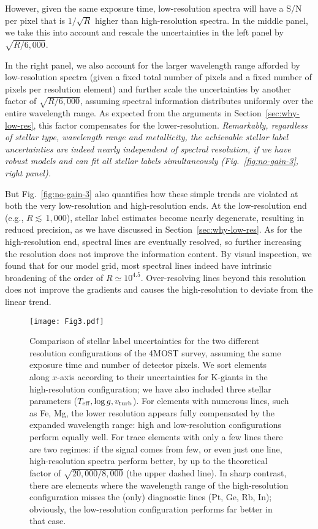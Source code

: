 \documentclass[iop]{emulateapj}
\begin{document}
\begin{CJK*}{UTF8}{gbsn}
However, given the same exposure time, low-resolution spectra will have a S/N per pixel that is  $1/\sqrt{R}$ higher than high-resolution spectra. In the middle panel, we take this into account and rescale the uncertainties in the left panel by $\sqrt{R/6,000}$. 

In the right panel, we also account for the larger wavelength range afforded by low-resolution spectra (given a fixed total number of pixels and a fixed number of pixels per resolution element) and further scale the uncertainties by another factor of $\sqrt{R/6,000}$, assuming spectral information distributes uniformly over the entire wavelength range. As expected from the arguments in Section~\ref{sec:why-low-res}, this factor compensates for the lower-resolution. {\em Remarkably, regardless of stellar type, wavelength range and metallicity, the achievable stellar label uncertainties are indeed nearly independent of spectral resolution, if we have robust models and can fit all stellar labels simultaneously (Fig.~\ref{fig:no-gain-3}, right panel).}

But Fig.~\ref{fig:no-gain-3} also quantifies how these simple trends are violated at both the very low-resolution and high-resolution ends. At the low-resolution end (e.g., $R \lesssim \,$1$,$000), stellar label estimates become nearly degenerate, resulting in reduced precision, as we have discussed in Section~\ref{sec:why-low-res}. As for the high-resolution end, spectral lines are eventually resolved, so further increasing the resolution does not improve the information content. By visual inspection, we found that for our model grid, most spectral lines  indeed have intrinsic broadening of the order of $R \simeq 10^{4.5}$. Over-resolving lines beyond this resolution does not improve the gradients and causes the high-resolution to deviate from the linear trend.

\begin{figure*}
\centering
\texttt{[image: Fig3.pdf]}
\caption{Comparison of stellar label uncertainties for the two different resolution configurations of the 4MOST survey, assuming the same exposure time and number of detector pixels. We sort elements along $x$-axis according to their uncertainties for K-giants in the high-resolution configuration; we have also included three stellar parameters ($T_{\rm eff}, \log g, v_{\rm turb}$). For elements with numerous lines, such as Fe, Mg, the lower resolution appears fully compensated by the expanded wavelength range: high and low-resolution configurations perform equally well. For trace elements with only a few lines there are two regimes: if the signal comes from few, or even just one line, high-resolution spectra perform better, by up to the theoretical factor of $\sqrt{20,000/8,000}$ (the upper dashed line). In sharp contrast, there are elements where the wavelength range of the high-resolution configuration misses the (only) diagnostic lines (Pt, Ge, Rb, In); obviously, the low-resolution configuration performs far better in that case.}
\label{fig:no-gain-4}
\end{figure*}


\end{CJK*}
\end{document}

